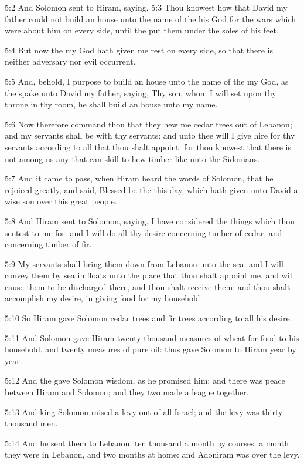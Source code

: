 5:2 And Solomon sent to Hiram, saying, 5:3 Thou knowest how that David
my father could not build an house unto the name of the \LORD his God
for the wars which were about him on every side, until the \LORD put
them under the soles of his feet.

5:4 But now the \LORD my God hath given me rest on every side, so that
there is neither adversary nor evil occurrent.

5:5 And, behold, I purpose to build an house unto the name of the \LORD
my God, as the \LORD spake unto David my father, saying, Thy son, whom
I will set upon thy throne in thy room, he shall build an house unto
my name.

5:6 Now therefore command thou that they hew me cedar trees out of
Lebanon; and my servants shall be with thy servants: and unto thee
will I give hire for thy servants according to all that thou shalt
appoint: for thou knowest that there is not among us any that can
skill to hew timber like unto the Sidonians.

5:7 And it came to pass, when Hiram heard the words of Solomon, that
he rejoiced greatly, and said, Blessed be the \LORD this day, which
hath given unto David a wise son over this great people.

5:8 And Hiram sent to Solomon, saying, I have considered the things
which thou sentest to me for: and I will do all thy desire concerning
timber of cedar, and concerning timber of fir.

5:9 My servants shall bring them down from Lebanon unto the sea: and I
will convey them by sea in floats unto the place that thou shalt
appoint me, and will cause them to be discharged there, and thou shalt
receive them: and thou shalt accomplish my desire, in giving food for
my household.

5:10 So Hiram gave Solomon cedar trees and fir trees according to all
his desire.

5:11 And Solomon gave Hiram twenty thousand measures of wheat for food
to his household, and twenty measures of pure oil: thus gave Solomon
to Hiram year by year.

5:12 And the \LORD gave Solomon wisdom, as he promised him: and there
was peace between Hiram and Solomon; and they two made a league
together.

5:13 And king Solomon raised a levy out of all Israel; and the levy
was thirty thousand men.

5:14 And he sent them to Lebanon, ten thousand a month by courses: a
month they were in Lebanon, and two months at home: and Adoniram was
over the levy.

